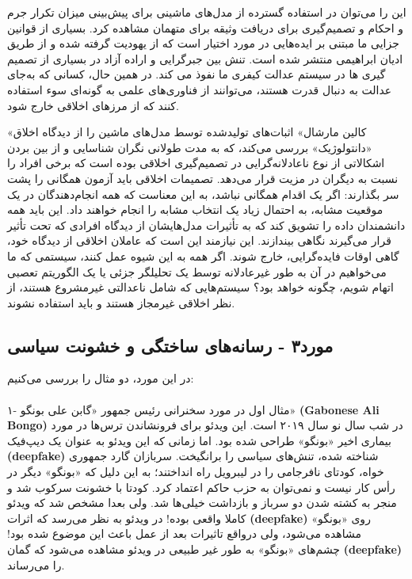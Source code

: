 این را می‌توان در استفاده گسترده از مدل‌های ماشینی برای پیش‌بینی میزان تکرار جرم و احکام و تصمیم‌گیری برای دریافت وثیقه برای متهمان مشاهده کرد.
بسیاری از قوانین جزایی ما مبتنی بر ایده‌هایی در مورد اختیار است که از یهودیت گرفته شده و از طریق ادیان ابراهیمی منتشر شده است.
تنش بین جبرگرایی و اراده آزاد در بسیاری از تصمیم گیری ها در سیستم عدالت کیفری ما نفوذ می کند.
در همین حال، کسانی که به‌جای عدالت به دنبال قدرت هستند، می‌توانند از فناوری‌های علمی به گونه‌ای سوء استفاده کنند که از مرزهای اخلاقی خارج شود.

«کالین مارشال» اثبات‌های تولیدشده توسط مدل‌های ماشین را از دیدگاه اخلاق «دانتولوژیک» بررسی می‌کند، که به مدت طولانی نگران شناسایی و از بین بردن اشکالاتی از نوع ناعادلانه‌گرایی در تصمیم‌گیری اخلاقی بوده است که برخی افراد را نسبت به دیگران در مزیت قرار می‌دهد.
تصمیمات اخلاقی باید آزمون همگانی را پشت سر بگذارند: اگر یک اقدام همگانی نباشد، به این معناست که همه انجام‌دهندگان در یک موقعیت مشابه، به احتمال زیاد یک انتخاب مشابه را انجام خواهند داد.
این باید همه دانشمندان داده را تشویق کند که به تأثیرات مدل‌هایشان از دیدگاه افرادی که تحت تأثیر قرار می‌گیرند نگاهی بیندازند.
این نیازمند این است که عاملان اخلاقی از دیدگاه خود، گاهی اوقات فایده‌گرایی، خارج شوند.
اگر همه به این شیوه عمل کنند، سیستمی که ما می‌خواهیم در آن به طور غیرعادلانه توسط یک تحلیلگر جزئی یا یک الگوریتم تعصبی اتهام شویم، چگونه خواهد بود؟ سیستم‌هایی که شامل ناعدالتی غیرمشروع هستند، از نظر اخلاقی غیرمجاز هستند و باید استفاده نشوند.

\subsection*{مورد۳ - رسانه‌های ساختگی و خشونت سیاسی}
در این مورد، دو مثال را بررسی می‌کنیم:

\paragraph{}
۱- مثال اول در مورد سخنرانی رئیس جمهور «گابن علی بونگو» \textenglish{\textbf{(Gabonese Ali Bongo)}} در شب سال نو سال ۲۰۱۹ است.
این ویدئو برای فرونشاندن ترس‌ها در مورد بیماری اخیر «بونگو» طراحی شده بود.
اما زمانی که این ویدئو به عنوان یک دیپ‌فیک \textenglish{\textbf{(deepfake)}} شناخته شده، تنش‌های سیاسی را برانگیخت.
سربازان گارد جمهوری خواه، کودتای نافرجامی را در لیبرویل راه انداختند؛ به این دلیل که «بونگو» دیگر در رأس کار نیست و نمی‌توان به حزب حاکم اعتماد کرد.
کودتا با خشونت سرکوب شد و منجر به کشته شدن دو سرباز و بازداشت خیلی‌ها شد.
ولی بعدا مشخص شد که ویدئو کاملا واقعی بوده!
در ویدئو به نظر می‌رسد که اثرات \textenglish{\textbf{(deepfake)}} روی «بونگو» مشاهده می‌شود، ولی درواقع تاثیرات بعد از عمل باعث این موضوع شده بود!
چشم‌های «بونگو» به طور غیر طبیعی در ویدئو مشاهده می‌شود که گمان \textenglish{\textbf{(deepfake)}} را می‌رساند.

